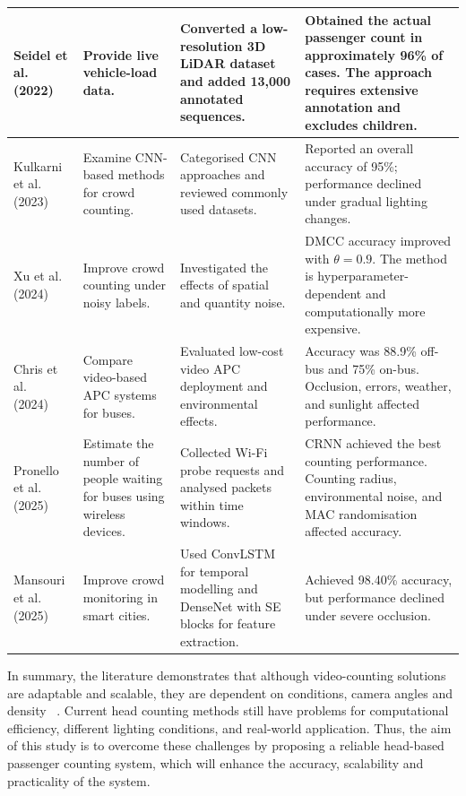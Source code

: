 \begin{longtable}{| 
		>{\raggedright\arraybackslash}p{2.2cm}| 
		>{\raggedright\arraybackslash}p{3.2cm}| 
		>{\raggedright\arraybackslash}p{4.0cm}| 
		>{\raggedright\arraybackslash}p{4.0cm}| 
	}
	Seidel et al. (2022)~\cite{seidel2022napc} 
	& 
	Provide live vehicle-load data. 
	& 
	Converted a low-resolution 3D LiDAR dataset and added 13,000 annotated sequences. 
	& 
	Obtained the actual passenger count in approximately 96\% of cases. The approach requires extensive annotation and excludes children. 
	\\ 
	\hline 
	
	Kulkarni et al. (2023)~\cite{kulkarni2023advances} 
	& 
	Examine CNN-based methods for crowd counting. 
	& 
	Categorised CNN approaches and reviewed commonly used datasets. 
	& 
	Reported an overall accuracy of 95\%; performance declined under gradual lighting changes. 
	\\ 
	\hline 
	
	Xu et al. (2024)~\cite{xu2024label} 
	& 
	Improve crowd counting under noisy labels. 
	& 
	Investigated the effects of spatial and quantity noise. 
	& 
	DMCC accuracy improved with $\theta=0.9$. The method is hyperparameter-dependent and computationally more expensive. 
	\\ 
	\hline 
	
	Chris et al. (2024)~\cite{Chris2024} 
	& 
	Compare video-based APC systems for buses. 
	& 
	Evaluated low-cost video APC deployment and environmental effects. 
	& 
	Accuracy was 88.9\% off-bus and 75\% on-bus. Occlusion, errors, weather, and sunlight affected performance. 
	\\ 
	\hline 
	
	Pronello et al. (2025)~\cite{pronello2025lowcost} 
	& 
	Estimate the number of people waiting for buses using wireless devices. 
	& 
	Collected Wi-Fi probe requests and analysed packets within time windows. 
	& 
	CRNN achieved the best counting performance. Counting radius, environmental noise, and MAC randomisation affected accuracy. 
	\\ 
	\hline 
	
	Mansouri et al. (2025)~\cite{mansouri2025deep} 
	& 
	Improve crowd monitoring in smart cities. 
	& 
	Used ConvLSTM for temporal modelling and DenseNet with SE blocks for feature extraction. 
	& 
	Achieved 98.40\% accuracy, but performance declined under severe occlusion. 
	\\ 
	\hline 
	
\end{longtable}

In summary, the literature demonstrates that although video-counting solutions are adaptable and scalable, they are dependent on conditions, camera angles and density ~\cite{Chris2023}. Current head counting methods still have problems for computational efficiency, different lighting conditions, and real-world application. Thus, the aim of this study is to overcome these challenges by proposing a reliable head-based passenger counting system, which will enhance the accuracy, scalability and practicality of the system.

